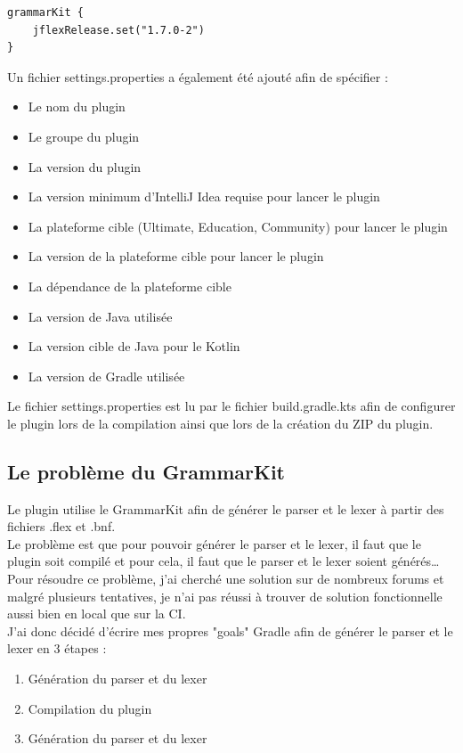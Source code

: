 \begin{lstlisting}[caption={Utilisation de JFlex}, label={lst:jflex}]
grammarKit {
    jflexRelease.set("1.7.0-2")
}
\end{lstlisting}

Un fichier settings.properties a également été ajouté afin de spécifier :
\begin{itemize}
    \item Le nom du plugin
    \item Le groupe du plugin
    \item La version du plugin
    \item La version minimum d'IntelliJ Idea requise pour lancer le plugin
    \item La plateforme cible (Ultimate, Education, Community) pour lancer le plugin
    \item La version de la plateforme cible pour lancer le plugin
    \item La dépendance de la plateforme cible
    \item La version de Java utilisée
    \item La version cible de Java pour le Kotlin
    \item La version de Gradle utilisée
\end{itemize}

Le fichier settings.properties est lu par le fichier build.gradle.kts afin de configurer le plugin lors de la compilation ainsi que lors de la création du ZIP du plugin.

\subsection{Le problème du GrammarKit}
\noindent
Le plugin utilise le GrammarKit afin de générer le parser et le lexer à partir des fichiers .flex et .bnf.
\\ \noindent Le problème est que pour pouvoir générer le parser et le lexer, il faut que le plugin soit compilé et pour cela, il faut que le parser et le lexer soient générés\ldots
\newdoubleline
Pour résoudre ce problème, j'ai cherché une solution sur de nombreux forums et malgré plusieurs tentatives, je n'ai pas réussi à trouver de solution fonctionnelle aussi bien en local que sur la CI.
\\ \noindent J'ai donc décidé d'écrire mes propres "goals" Gradle afin de générer le parser et le lexer en 3 étapes :
\begin{enumerate}
    \item Génération du parser et du lexer
    \item Compilation du plugin
    \item Génération du parser et du lexer
\end{enumerate}



